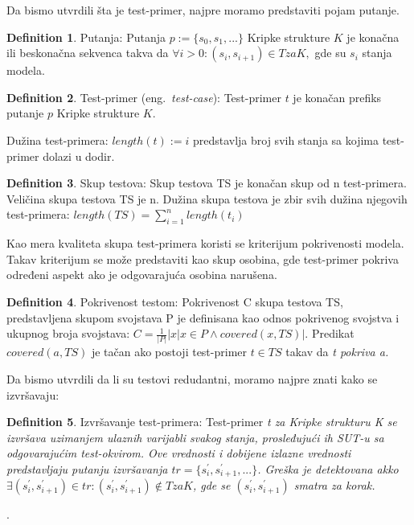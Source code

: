 \documentclass[a4paper]{article}
\theoremstyle{definition}
\newtheorem{definition}{Definition}[section]
\begin{document}
Da bismo utvrdili šta je test-primer, najpre moramo predstaviti pojam putanje.

\begin{definition}{Putanja:}
Putanja $ p := \{s_0, s_1, ...\}$ Kripke strukture $K$ je konačna ili beskonačna sekvenca takva da $ \forall i > 0 : (s_i, s_{i+1}) \in T za K, $ gde su $ s_i $ stanja modela.
\end{definition}

\begin{definition}{Test-primer (eng.~{\em test-case}):}
Test-primer $t$ je konačan prefiks putanje $p$ Kripke strukture $K$.
\end{definition}

Dužina test-primera: $ length(t) := i$ predstavlja broj svih stanja sa kojima test-primer dolazi u dodir.

\begin{definition}{Skup testova:}
Skup testova TS je konačan skup od n test-primera. Veličina skupa testova TS je n. Dužina skupa testova je zbir svih dužina njegovih test-primera: $
    length(TS) = \sum_{i=1}^{n}length(t_i)$
\end{definition}

Kao mera kvaliteta skupa test-primera koristi se kriterijum pokrivenosti modela. Takav kriterijum se može predstaviti kao skup osobina, gde test-primer pokriva određeni aspekt ako je odgovarajuća osobina narušena.

\begin{definition}{Pokrivenost testom:}
Pokrivenost C skupa testova TS, predstavljena skupom svojstava P je definisana kao odnos pokrivenog svojstva i ukupnog broja svojstava:
$
    C = \frac{1}{|P|}|{x|x \in P \land covered(x,TS)}|
$. Predikat $ covered(a, TS)$ je tačan ako postoji test-primer $ t \in TS$ takav da \em{t} pokriva \em{a}.
\end{definition}

Da bismo utvrdili da li su testovi redudantni, moramo najpre znati kako se izvršavaju:

\begin{definition}{Izvršavanje test-primera:}
Test-primer \em{t} za Kripke strukturu K se izvršava uzimanjem ulaznih varijabli svakog stanja, prosleđujući ih SUT-u sa odgovarajućim test-okvirom. Ove vrednosti i dobijene izlazne vrednosti predstavljaju putanju izvršavanja $ tr = \{s_{i}^{'}, s_{i+1}^{'}, ...\} $. Greška je detektovana akko $ \exists (s_{i}^{'}, s_{i+1}^{'}) \in tr : (s_{i}^{'}, s_{i+1}^{'}) \notin T za K $, gde se $ (s_{i}^{'}, s_{i+1}^{'})$ smatra za korak.
\end{definition}.
\end{document}
